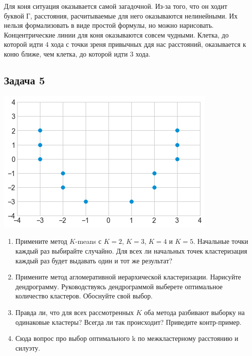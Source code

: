 \documentclass[12pt, a4paper, oneside]{article}
\begin{document}
{\begin{minipage}[t]{0.45\textwidth}
\end{minipage}

Для коня ситуация оказывается самой загадочной. Из-за того, что он ходит буквой Г, расстояния, расчитываемые для него оказываются нелинейными. Их нельзя формализовать в виде простой формулы, но можно нарисовать. Концентрические линии для коня оказываются совсем чудными. Клетка, до которой идти $4$ хода с точки зреня привычных ддя нас расстояний, оказывается к коню ближе, чем клетка, до которой идти $3$ хода. 
}{ }




\subsection*{Задача 5} 

\begin{center}
	\includegraphics[scale=0.7]{knn_3.png}
\end{center}

\begin{enumerate}
	\item Примените метод $K$-means с $K=2$, $K=3$, $K=4$ и $K=5$. Начальные точки каждый раз выбирайте случайно.  Для всех ли начальных точек кластеризация каждый раз будет выдавать один и тот же результат? 
	\item Примените метод агломеративной иерархической кластеризации. Нарисуйте дендрограмму. Руководствуясь дендрограммой выберете оптимальное количество кластеров. Обоснуйте свой выбор.
	\item Правда ли, что для всех рассмотренных $K$ оба метода разбивают выборку на одинаковые кластеры?  Всегда ли так происходит? Приведите контр-пример. 
	
	\item Сюда вопрос про выбор оптимального k по межкластерному расстоянию и силуэту.
	
\end{enumerate}
\end{document}
